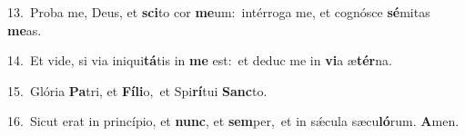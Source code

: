 {\numbfont\textcolor{\numbcolor}{13.}}~Proba me, Deus, et \textbf{sci}\-to cor \textbf{me}\-um:~\star intérroga me, et cognósce \textbf{sé}\-mitas \textbf{me}\-as.\par
{\numbfont\textcolor{\numbcolor}{14.}}~Et vide, si via iniqui\-\textbf{tá}\-tis in \textbf{me} est:~\star et deduc me in \textbf{vi}\-a æ\-\textbf{tér}\-na.\par
{\numbfont\textcolor{\numbcolor}{15.}}~Glória \textbf{Pa}\-tri, et \textbf{Fí}\-\textbf{li}o,~\star et Spi\-\textbf{rí}\-tui \textbf{Sanc}\-to.\par
{\numbfont\textcolor{\numbcolor}{16.}}~Sicut erat in princípio, et \textbf{nunc}\-, et \textbf{sem}\-per,~\star et in sǽcula sæcu\-\textbf{ló}\-rum. \textbf{A}\-men.\par
